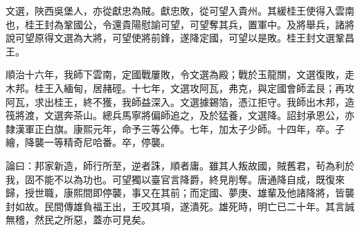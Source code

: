 \begin{pinyinscope}
文選，陜西吳堡人，亦從獻忠為賊。獻忠敗，從可望入貴州。其緩桂王使得入雲南也，桂王封為鞏國公，令還貴陽慰諭可望，可望奪其兵，置軍中。及將舉兵，諸將說可望原得文選為大將，可望使將前鋒，遂降定國，可望以是敗。桂王封文選鞏昌王。

順治十六年，我師下雲南，定國戰屢敗，令文選為殿；戰於玉龍關，文選復敗，走木邦。桂王入緬甸，居赭硜。十七年，文選攻阿瓦，弗克，與定國會師孟艮；再攻阿瓦，求出桂王，終不獲，我師益深入。文選據錫箔，憑江拒守。我師出木邦，造筏將渡，文選奔茶山。總兵馬寧將偏師追之，及於猛養，文選降。詔封承恩公，亦隸漢軍正白旗。康熙元年，命予三等公俸。七年，加太子少師。十四年，卒。子繪，降襲一等精奇尼哈番。卒，停襲。

論曰：邦家新造，師行所至，逆者誅，順者庸。雖其人叛故國，賊舊君，茍為利於我，固不能不以為功也。可望獨以臺官言降爵，終見削奪。唐通降自成，既復來歸，授世職，康熙間即停襲，事又在其前；而定國、夢庚、雄輩及他諸降將，皆襲封如故。民間傳雄負福王出，王咬其項，遂潰死。雄死時，明亡已二十年。其言誠無稽，然民之所惡，蓋亦可見矣。


\end{pinyinscope}
